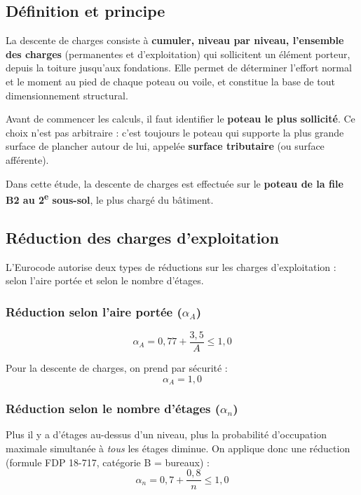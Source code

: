 
\subsection{Définition et principe}

La descente de charges consiste à \textbf{cumuler, niveau par niveau, l'ensemble des charges} (permanentes et d'exploitation) qui sollicitent un élément porteur, depuis la toiture jusqu'aux fondations. Elle permet de déterminer l'effort normal et le moment au pied de chaque poteau ou voile, et constitue la base de tout dimensionnement structural.

Avant de commencer les calculs, il faut identifier le \textbf{poteau le plus sollicité}. Ce choix n'est pas arbitraire : c'est toujours le poteau qui supporte la plus grande surface de plancher autour de lui, appelée \textbf{surface tributaire} (ou surface afférente).

Dans cette étude, la descente de charges est effectuée sur le \textbf{poteau de la file B2 au 2\textsuperscript{e} sous-sol}, le plus chargé du bâtiment.

\subsection{Réduction des charges d'exploitation}

L'Eurocode autorise deux types de réductions sur les charges d'exploitation : selon l'aire portée et selon le nombre d'étages.

\subsubsection{Réduction selon l'aire portée \texorpdfstring{($\alpha_A$)}{(αA)}}

\[
  \alpha_A = 0{,}77 + \frac{3{,}5}{A} \leq 1{,}0
\]

Pour la descente de charges, on prend par sécurité :
\[
  \boxed{\alpha_A = 1{,}0}
\]

\subsubsection{Réduction selon le nombre d'étages \texorpdfstring{($\alpha_n$)}{(αn)}}

Plus il y a d'étages au-dessus d'un niveau, plus la probabilité d'occupation maximale simultanée à \emph{tous} les étages diminue. On applique donc une réduction (formule FDP 18-717, catégorie B = bureaux) :
\[
  \alpha_n = 0{,}7 + \frac{0{,}8}{n} \leq 1{,}0
\]

